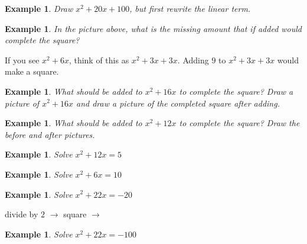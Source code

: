 \documentclass[twoside]{tufte-handout}
\newcounter{ekcounter}%
\theoremstyle{ekimcustom}
\newtheorem{exm}[ekcounter]{Example}
\begin{document}
\vskip40pt
\begin{exm}
Draw $x^2+20x+100$, but first rewrite the linear term.
\end{exm}




\begin{exm}
In the picture above, what is the missing amount that if added would complete the square?
\end{exm}


If you see $x^2+6x$, think of this as $x^2+3x+3x$. Adding $9$ to $x^2+3x+3x$ would make a square.
\vskip10pt

\begin{exm}
What should be added to $x^2+16x$ to complete the square? Draw a picture of $x^2+16x$ and draw a picture of the completed square after adding.
\end{exm}
\vskip10pt

\begin{exm}
What should be added to $x^2+12x$ to complete the square? Draw the before and after pictures.
\end{exm}
\vskip10pt


\begin{exm}
Solve $x^2+12x=5$
\end{exm}
\vskip10pt

\begin{exm}
Solve $x^2+6x=10$
\end{exm}
\vskip10pt

\begin{exm}
Solve $x^2+22x=-20$
\end{exm}
\vskip10pt


 divide by $2$ $\rightarrow$  square $\rightarrow$ 

\begin{exm}
Solve $x^2+22x=-100$
\end{exm}
\vskip10pt
\end{document}
